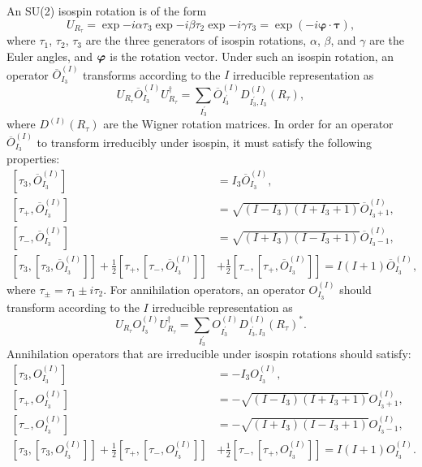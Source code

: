     An SU(2) isospin rotation is of the form
    \begin{equation}
        U_{R_{\tau}}=\exp{-i\alpha\tau_3}\exp{-i\beta\tau_2}\exp{-i\gamma\tau_3} = \exp (-i \boldsymbol{\varphi} \cdot \boldsymbol{\tau}),
    \end{equation}
    where $\tau_1$, $\tau_2$, $\tau_3$ are the three generators of isospin rotations, $\alpha$, $\beta$, and $\gamma$ are the Euler angles, and $\boldsymbol{\varphi}$ is the rotation vector. Under such an isospin rotation, an operator $\overline O_{I_3}^{(I)}$ transforms according to the $I$ irreducible representation as
    \begin{equation}
        U_{R_{\tau}}\overline O_{I_3}^{(I)}U_{R_{\tau}}^\dagger = \sum_{I_3^\prime} \overline O_{I_3^\prime}^{(I)} D^{(I)}_{I_3^\prime, I_3}(R_\tau),
    \end{equation}
    where $D^{(I)}(R_\tau)$ are the Wigner rotation matrices. In order for an operator $\overline O_{I_3}^{(I)}$ to transform irreducibly under isospin, it must satisfy the following properties:
    \begin{align}
        \left[\tau_3, \overline O_{I_3}^{(I)}\right] &= I_3 \overline O_{I_3}^{(I)}, \\
        \left[\tau_+, \overline O_{I_3}^{(I)}\right] &= \sqrt{(I - I_3)(I + I_3 + 1)} \overline O_{I_3 + 1}^{(I)}, \\
        \left[\tau_-, \overline O_{I_3}^{(I)}\right] &= \sqrt{(I + I_3)(I - I_3 + 1)} \overline O_{I_3 - 1}^{(I)}, \\
        \left[\tau_3, \left[\tau_3, \overline O_{I_3}^{(I)}\right] \right] + \frac{1}{2} \left[\tau_+, \left[\tau_-, \overline O_{I_3}^{(I)}\right]\right] &+ \frac{1}{2}\left[\tau_-, \left[\tau_+, \overline O_{I_3}^{(I)}\right]\right] = I(I + 1) \overline O_{I_3}^{(I)},
    \end{align}
    where $\tau_\pm = \tau_1 \pm i\tau_2$. For annihilation operators, an operator $O_{I_3}^{(I)}$ should transform according to the $I$ irreducible representation as
    \begin{equation}
        U_{R_{\tau}}O_{I_3}^{(I)}U_{R_{\tau}}^\dagger = \sum_{I_3^\prime} O_{I_3^\prime}^{(I)} D^{(I)}_{I_3^\prime, I_3}(R_\tau)^*.
    \end{equation}
    Annihilation operators that are irreducible under isospin rotations should satisfy:
    \begin{align}
        \left[\tau_3, O_{I_3}^{(I)}\right] &= -I_3 O_{I_3}^{(I)}, \\
        \left[\tau_+, O_{I_3}^{(I)}\right] &= -\sqrt{(I - I_3)(I + I_3 + 1)} O_{I_3 + 1}^{(I)}, \\
        \left[\tau_-, O_{I_3}^{(I)}\right] &= -\sqrt{(I + I_3)(I - I_3 + 1)} O_{I_3 - 1}^{(I)}, \\
        \left[\tau_3, \left[\tau_3, O_{I_3}^{(I)}\right] \right] + \frac{1}{2} \left[\tau_+, \left[\tau_-, O_{I_3}^{(I)}\right]\right] &+ \frac{1}{2}\left[\tau_-, \left[\tau_+, O_{I_3}^{(I)}\right]\right] = I(I + 1)  O_{I_3}^{(I)}.
    \end{align}
